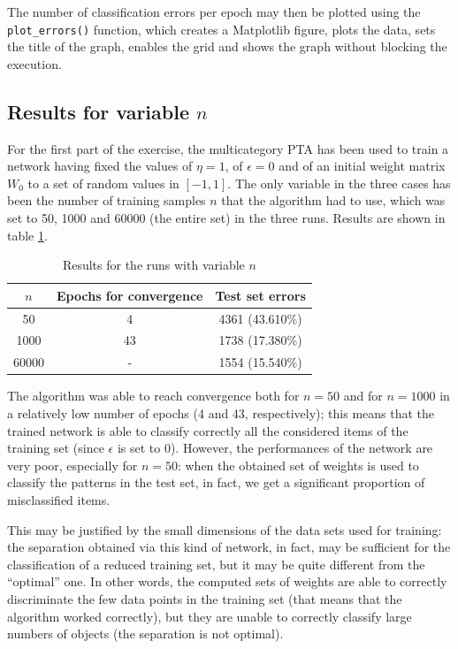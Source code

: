 \documentclass[letterpaper,headings=standardclasses]{scrartcl}
\begin{document}
The number of classification errors per epoch may then be plotted using the \texttt{plot\_errors()} function, which creates a Matplotlib figure, plots the data, sets the title of the graph, enables the grid and shows the graph without blocking the execution.

\subsection{Results for variable $n$}

For the first part of the exercise, the multicategory PTA has been used to train a network having fixed the values of $\eta = 1$, of $\epsilon = 0$ and of an initial weight matrix $W_0$ to a set of random values in $[-1, 1]$. The only variable in the three cases has been the number of training samples $n$ that the algorithm had to use, which was set to 50, 1000 and 60000 (the entire set) in the three runs. Results are shown in table \ref{results_varn}.

\begin{table}[h]
\centering
\begin{tabular}{|c|c|c|}
\hline
$n$   & Epochs for convergence & Test set errors \\ \hline
50    & 4  & 4361 (43.610\%) \\ \hline
1000  & 43 & 1738 (17.380\%) \\ \hline
60000 & -  & 1554 (15.540\%) \\ \hline
\end{tabular}
\caption{Results for the runs with variable $n$}
\label{results_varn}
\end{table}

The algorithm was able to reach convergence both for $n = 50$ and for $n = 1000$ in a relatively low number of epochs (4 and 43, respectively); this means that the trained network is able to classify correctly all the considered items of the training set (since $\epsilon$ is set to 0). However, the performances of the network are very poor, especially for $n = 50$: when the obtained set of weights is used to classify the patterns in the test set, in fact, we get a significant proportion of misclassified items.

This may be justified by the small dimensions of the data sets used for training: the separation obtained via this kind of network, in fact, may be sufficient for the classification of a reduced training set, but it may be quite different from the “optimal” one. In other words, the computed sets of weights are able to correctly discriminate the few data points in the training set (that means that the algorithm worked correctly), but they are unable to correctly classify large numbers of objects (the separation is not optimal).
\end{document}
